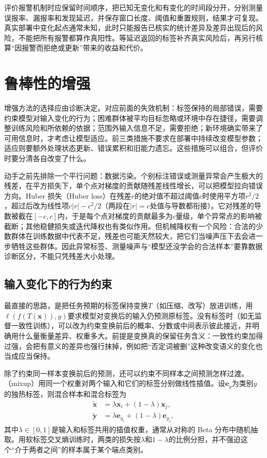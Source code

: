 评价报警机制时应保留时间顺序，把已知无变化和有变化的时间段分开，分别测量误报率、漏报率和发现延迟，并保存窗口长度、阈值和重置规则，结果才可复现。真实部署中变化起点通常未知，此时只能报告已核实的统计差异及差异出现后的风险，不能把所有报警都算作真阳性。等延迟返回的标签补齐真实风险后，再另行核算“因报警而拒绝或更新”带来的收益和代价。

\section{鲁棒性的增强}
\label{sec:robustness-enhancement}

增强方法的选择应由诊断决定。对应前面的失效机制：标签保持的局部错误，需要约束模型对输入变化的行为；困难群体被平均目标忽略或环境中存在捷径，需要调整训练风险和所依赖的依据；范围外输入信息不足，需要拒绝；新环境确实带来了可用信息时，才考虑让模型适应。前三类措施不要求在部署中持续改变模型参数；适应则要额外处理状态更新、错误累积和旧能力遗忘。这些措施可以组合，但评价时要分清各自改变了什么。

动手之前先排除一个平行问题：数据污染。个别标注错误或测量异常会产生极大的残差，在平方损失下，单个点对梯度的贡献随残差线性增长，可以把模型拉向错误方向。Huber 损失（Huber loss）在残差$r$的绝对值不超过阈值$c$时使用平方项$r^2/2$，超过后改为线性项$c|r|-c^2/2$（两段在$|r|=c$处值与导数都衔接）。它对残差的导数被截在$[-c,c]$内，于是每个点对梯度的贡献最多为$c$量级，单个异常点的影响被截断；其他稳健损失或迭代降权也有类似作用。但机械降权有一个风险：合法的少数群体在训练数据中代表不足，残差也可能天然较大，把它们当噪声压下去会进一步牺牲这些群体。因此异常标签、测量噪声与“模型还没学会的合法样本”要靠数据诊断区分，不能只凭残差大小处理。

\subsection{输入变化下的行为约束}
\label{sec:robustness-local-enhancement}

最直接的思路，是把任务预期的标签保持变换$T$（如压缩、改写）放进训练，用$\ell(f(T(\bm{x})),y)$要求模型对变换后的输入仍预测原标签。没有标签时（如无监督一致性训练），可以改为约束变换前后的概率、分数或中间表示彼此接近，并明确用什么量衡量差异、权重多大。前提是变换真的保留任务含义：一致性约束加得过强，会把有意义的差异也强行抹掉，例如把“否定词被删”这种改变语义的变化也当成应当保持。

除了约束同一样本变换前后的预测，还可以约束不同样本之间预测怎样过渡。（mixup）用同一个权重对两个输入和它们的标签分别做线性插值。设$\bm{e}_y$为类别$y$的独热标签，则混合样本和混合标签为
\begin{equation}
 \begin{aligned}
  \widetilde{\bm{x}}&=\lambda\bm{x}_i+(1-\lambda)\bm{x}_j,\\
  \widetilde{\bm{y}}&=\lambda\bm{e}_{y_i}
                         +(1-\lambda)\bm{e}_{y_j},
 \end{aligned}
 \label{eq:robustness-mixup}
\end{equation}
其中$\lambda\in[0,1]$是输入和标签共用的插值权重，通常从对称的 Beta 分布中随机抽取。用软标签交叉熵训练时，两类的损失按$\lambda$和$1-\lambda$的比例分担，并不强迫这个“介于两者之间”的样本属于某个端点类别。

